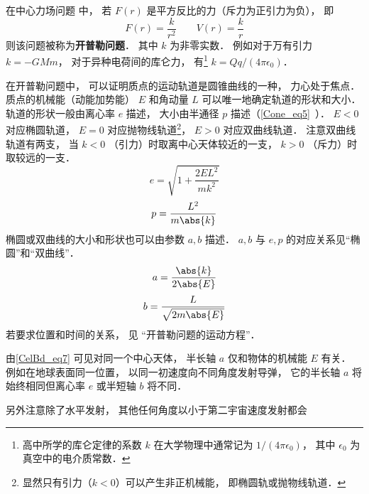 

在中心力场问题 中， 若 $F(r)$ 是平方反比的力（斥力为正引力为负）， 即
\begin{equation}
F(r) = \frac{k}{r^2}  \qquad V(r) = \frac{k}{r}
\end{equation}
则该问题被称为\textbf{开普勒问题}． 其中 $k$ 为非零实数． 例如对于万有引力 $k = -GMm$， 对于异种电荷间的库仑力， 有\footnote{高中所学的库仑定律的系数 $k$ 在大学物理中通常记为 $1/(4\pi\epsilon_0)$， 其中 $\epsilon_0$ 为真空中的电介质常数．} $k = Qq/(4\pi\epsilon_0)$．

在开普勒问题中， 可以证明质点的运动轨道是圆锥曲线的一种， 力心处于焦点． 质点的机械能（动能加势能） $E$ 和角动量 $L$ 可以唯一地确定轨道的形状和大小． 轨道的形状一般由离心率 $e$ 描述， 大小由半通径 $p$ 描述（\autoref{Cone_eq5}~）． $E < 0$ 对应椭圆轨道， $E = 0$ 对应抛物线轨道\footnote{显然只有引力（$k < 0$）可以产生非正机械能， 即椭圆轨或抛物线轨道．}， $E > 0$ 对应双曲线轨道． 注意双曲线轨道有两支， 当 $k < 0$ （引力）时取离中心天体较近的一支， $k > 0$ （斥力）时取较远的一支．
\begin{equation}\label{CelBd_eq2}
e = \sqrt{1 + \frac{2EL^2}{mk^2}}
\end{equation}
\begin{equation}\label{CelBd_eq3}
p = \frac{L^2}{m\abs{k}}
\end{equation}
椭圆或双曲线的大小和形状也可以由参数 $a,b$ 描述． $a,b$ 与 $e,p$ 的对应关系见“椭圆”和“双曲线”．
\begin{equation}\label{CelBd_eq7}
a = \frac{\abs{k}}{2\abs{E}}
\end{equation}
\begin{equation}\label{CelBd_eq8}
b = \frac{L}{\sqrt{2m\abs{E}}}
\end{equation}
若要求位置和时间的关系， 见 “开普勒问题的运动方程”．

\begin{example}{}
由\autoref{CelBd_eq7} 可见对同一个中心天体， 半长轴 $a$ 仅和物体的机械能 $E$ 有关． 例如在地球表面同一位置， 以同一初速度向不同角度发射导弹， 它的半长轴 $a$ 将始终相同但离心率 $e$ 或半短轴 $b$ 将不同．

另外注意除了水平发射， 其他任何角度以小于第二宇宙速度发射都会
\end{example}

